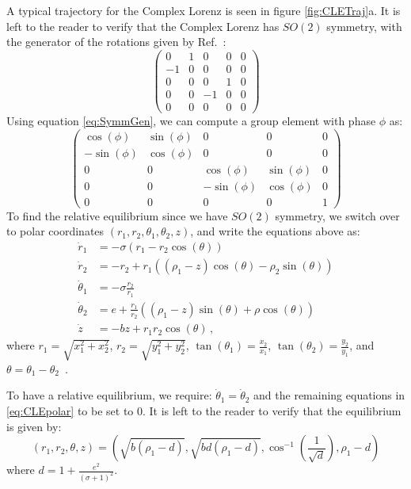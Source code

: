 \documentclass[12 pt]{article}
\begin{document}
A typical trajectory for the Complex Lorenz is seen in figure \ref{fig:CLETraj}a.  It is left to the reader to verify that the Complex Lorenz has $SO(2)$ symmetry, with the generator of the rotations given by Ref.~\cite{CB}:
\[ \left( \begin{array}{ccccc}
0 & 1 & 0 & 0 & 0 \\
-1 & 0 & 0 & 0 & 0 \\
0 & 0 & 0 & 1 & 0\\
0 & 0 & -1 & 0 & 0 \\
0 & 0 & 0 & 0 & 0\end{array} \right)\]
Using equation \ref{eq:SymmGen}, we can compute a group element with
phase $\phi$ as:
\begin{equation}
\left(
\begin{array}{ccccc}
\cos(\phi) & \sin(\phi) & 0 & 0 & 0 \\
-\sin(\phi) & \cos(\phi) & 0 & 0 & 0 \\
0 & 0 & \cos(\phi) & \sin(\phi) & 0\\
0 & 0 & -\sin(\phi) & \cos(\phi) & 0 \\
0 & 0 & 0 & 0 & 1
\end{array}\right)
\end{equation}
To find the relative equilibrium since we have $SO(2)$ symmetry, we
switch over to polar coordinates $(r_1, r_2, \theta_1, \theta_2, z)$, and
write the equations above as:
\begin{equation}
\begin{split}
  \dot r_1 &= -\sigma(r_1 - r_2\cos(\theta)) \\
  \dot r_2 &=   -r_2 + r_1((\rho_1 - z)\cos(\theta) - \rho_2\sin(\theta)) \\
  \dot \theta_1 &= -\sigma \frac{r_2}{r_1} \\
  \dot \theta_2 &= e + \frac{r_1}{r_2}((\rho_1 - z)\sin(\theta)+\rho\cos(\theta)) \\
  \dot z &= -bz  + r_1r_2\cos(\theta) \,,
    \label{eq:CLEpolar}
\end{split}
\end{equation}
where $r_1 = \sqrt{x_1^2 + x_2^2}$, $r_2 = \sqrt{y_1^2 + y_2^2}$,
$\tan(\theta_1) = \frac{x_2}{x_1}$, $\tan(\theta_2) = \frac{y_2}{y_1}$,
and $\theta = \theta_1-\theta_2$~\cite{CB}.

To have a relative equilibrium, we require: $\dot \theta_1 = \dot
\theta_2$ and the remaining equations in \ref{eq:CLEpolar} to be set to
$0$. It is left to the reader to verify that the equilibrium is given by:
\begin{equation}
(r_1, r_2, \theta, z) = (\sqrt{b(\rho_1-d)}, \sqrt{bd(\rho_1-d)}, \cos^{-1}(\frac{1}{\sqrt{d}}), \rho_1 - d)
\end{equation}
where $d = 1+ \frac{e^2}{(\sigma+1)^2}$.
\end{document}
